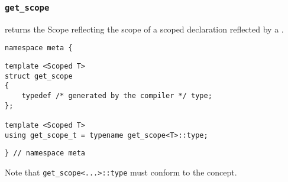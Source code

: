 

\subsubsection{\texttt{get\_scope}}

returns the Scope reflecting the scope of a scoped declaration reflected by a .

\begin{verbatim}
namespace meta {
\end{verbatim}
\begin{verbatim}
template <Scoped T>
struct get_scope
{
	typedef /* generated by the compiler */ type;
};
	
template <Scoped T>
using get_scope_t = typename get_scope<T>::type;

\end{verbatim}
\begin{verbatim}
} // namespace meta
\end{verbatim}


Note that \texttt{get\_scope<...>::type}
must conform to the  concept.
